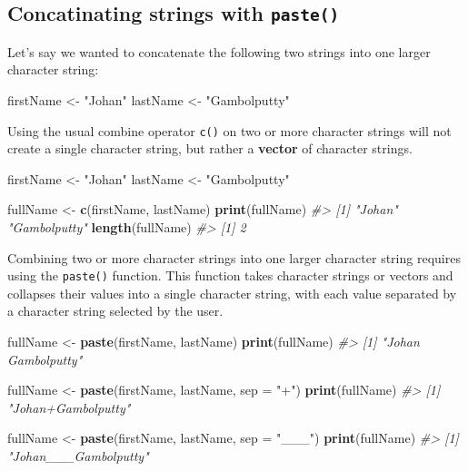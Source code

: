 \documentclass[]{book}
\newenvironment{Shaded}{\begin{snugshade}}{\end{snugshade}}
\newcommand{\KeywordTok}[1]{\textcolor[rgb]{0.13,0.29,0.53}{\textbf{#1}}}
\newcommand{\DataTypeTok}[1]{\textcolor[rgb]{0.13,0.29,0.53}{#1}}
\newcommand{\StringTok}[1]{\textcolor[rgb]{0.31,0.60,0.02}{#1}}
\newcommand{\CommentTok}[1]{\textcolor[rgb]{0.56,0.35,0.01}{\textit{#1}}}
\newcommand{\NormalTok}[1]{#1}
\begin{document}
\subsection{\texorpdfstring{Concatinating strings with
\texttt{paste()}}{Concatinating strings with paste()}}\label{concatinating-strings-with-paste}

Let's say we wanted to concatenate the following two strings into one
larger character string:

\begin{Shaded}
\begin{Highlighting}[]
\NormalTok{firstName <-}\StringTok{ "Johan"}
\NormalTok{lastName <-}\StringTok{ "Gambolputty"}
\end{Highlighting}
\end{Shaded}

Using the usual combine operator \texttt{c()} on two or more character
strings will not create a single character string, but rather a
\textbf{vector} of character strings.

\begin{Shaded}
\begin{Highlighting}[]
\NormalTok{firstName <-}\StringTok{ "Johan"}
\NormalTok{lastName <-}\StringTok{ "Gambolputty"}

\NormalTok{fullName <-}\StringTok{ }\KeywordTok{c}\NormalTok{(firstName, lastName)}
\KeywordTok{print}\NormalTok{(fullName)}
\CommentTok{#> [1] "Johan"       "Gambolputty"}
\KeywordTok{length}\NormalTok{(fullName)}
\CommentTok{#> [1] 2}
\end{Highlighting}
\end{Shaded}

Combining two or more character strings into one larger character string
requires using the \texttt{paste()} function. This function takes
character strings or vectors and collapses their values into a single
character string, with each value separated by a character string
selected by the user.

\begin{Shaded}
\begin{Highlighting}[]
\NormalTok{fullName <-}\StringTok{ }\KeywordTok{paste}\NormalTok{(firstName, lastName)}
\KeywordTok{print}\NormalTok{(fullName)}
\CommentTok{#> [1] "Johan Gambolputty"}

\NormalTok{fullName <-}\StringTok{ }\KeywordTok{paste}\NormalTok{(firstName, lastName, }\DataTypeTok{sep =} \StringTok{"+"}\NormalTok{)}
\KeywordTok{print}\NormalTok{(fullName)}
\CommentTok{#> [1] "Johan+Gambolputty"}

\NormalTok{fullName <-}\StringTok{ }\KeywordTok{paste}\NormalTok{(firstName, lastName, }\DataTypeTok{sep =} \StringTok{"___"}\NormalTok{)}
\KeywordTok{print}\NormalTok{(fullName)}
\CommentTok{#> [1] "Johan___Gambolputty"}
\end{Highlighting}
\end{Shaded}
\end{document}
